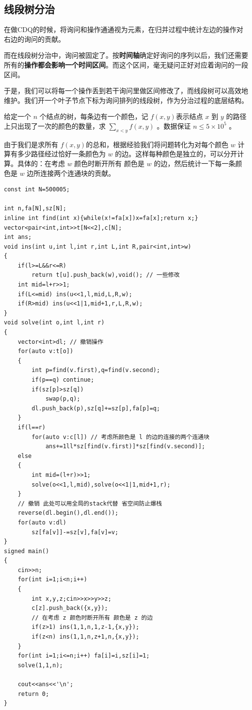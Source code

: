 \subsection{线段树分治}

\par \noindent 在做CDQ的时候，将询问和操作通通视为元素，在归并过程中统计左边的操作对右边的询问的贡献。
~\\
\par \noindent 而在线段树分治中，询问被固定了。按\textbf{时间轴}确定好询问的序列以后，我们还需要所有的\textbf{操作都会影响一个时间区间}。而这个区间，毫无疑问正好对应着询问的一段区间。
~\\
\par \noindent 于是，我们可以将每一个操作丢到若干询问里做区间修改了，而线段树可以高效地维护。我们开一个叶子节点下标为询问排列的线段树，作为分治过程的底层结构。
\begin{tcolorbox}
\par 给定一个 $n$ 个结点的树，每条边有一个颜色，记 $f(x,y)$表示结点 $x$ 到 $y$ 的路径上只出现了一次的颜色的数量，求 $\sum\limits_{x < y}f(x, y)$ 。数据保证 $n \le 5 \times 10^5$ 。

\par \noindent 由于我们是求所有 $f(x,y)$的总和，根据经验我们将问题转化为对每个颜色 $w$ 计算有多少路径经过恰好一条颜色为 $w$ 的边。这样每种颜色是独立的，可以分开计算。具体的：在考虑 $w$ 颜色时断开所有 颜色是 $w$ 的边，然后统计一下每一条颜色是 $w$ 边所连接两个连通块的贡献。

\end{tcolorbox}
\begin{verbatim}
const int N=500005;

int n,fa[N],sz[N];
inline int find(int x){while(x!=fa[x])x=fa[x];return x;}
vector<pair<int,int>>t[N<<2],c[N];
int ans;
void ins(int u,int l,int r,int L,int R,pair<int,int>w)
{
    if(l>=L&&r<=R)
        return t[u].push_back(w),void(); // 一些修改
    int mid=l+r>>1;
    if(L<=mid) ins(u<<1,l,mid,L,R,w);
    if(R>mid) ins(u<<1|1,mid+1,r,L,R,w);
}
void solve(int o,int l,int r)
{
    vector<int>dl; // 撤销操作
    for(auto v:t[o])
    {
        int p=find(v.first),q=find(v.second);
        if(p==q) continue;
        if(sz[p]>sz[q])
            swap(p,q);
        dl.push_back(p),sz[q]+=sz[p],fa[p]=q;
    }
    if(l==r)
        for(auto v:c[l]) // 考虑所颜色是 l 的边的连接的两个连通块
            ans+=1ll*sz[find(v.first)]*sz[find(v.second)];
    else
    {
        int mid=(l+r)>>1;
        solve(o<<1,l,mid),solve(o<<1|1,mid+1,r);
    }
    // 撤销 此处可以用全局的stack代替 省空间防止爆栈
    reverse(dl.begin(),dl.end());
    for(auto v:dl)
        sz[fa[v]]-=sz[v],fa[v]=v;
}
signed main()
{
    cin>>n;
    for(int i=1;i<n;i++)
    {
        int x,y,z;cin>>x>>y>>z;
        c[z].push_back({x,y});
        // 在考虑 z 颜色时断开所有 颜色是 z 的边
        if(z>1) ins(1,1,n,1,z-1,{x,y});
        if(z<n) ins(1,1,n,z+1,n,{x,y});
    }
    for(int i=1;i<=n;i++) fa[i]=i,sz[i]=1;
    solve(1,1,n);
    
    cout<<ans<<'\n';
    return 0;
}
\end{verbatim}

